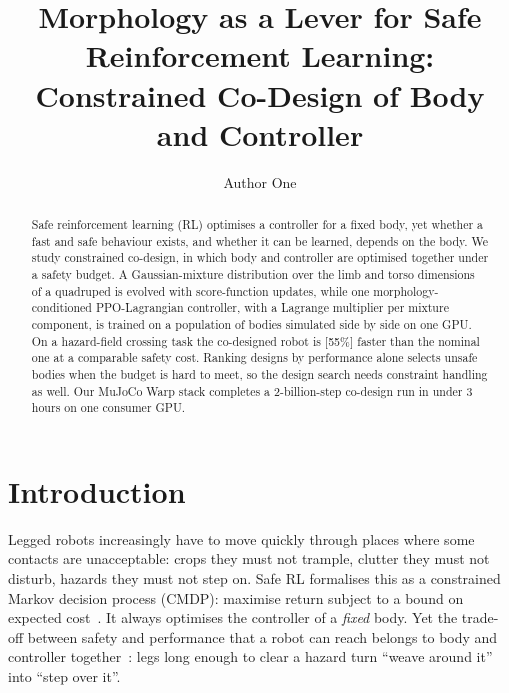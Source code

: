\documentclass[sigconf,review]{acmart}
\newcommand{\TODO}[1]{\textcolor{red!70!black}{[#1]}}
\begin{document}
\title[Morphology as a Lever for Safe RL]{Morphology as a Lever for Safe Reinforcement Learning: Constrained Co-Design of Body and Controller}

\author{Author One}

\renewcommand{\shortauthors}{Anonymous et al.}

\begin{abstract}
Safe reinforcement learning (RL) optimises a controller for a fixed body, yet whether a fast and safe behaviour exists, and whether it can be learned, depends on the body. We study constrained co-design, in which body and controller are optimised together under a safety budget. A Gaussian-mixture distribution over the limb and torso dimensions of a quadruped is evolved with score-function updates, while one morphology-conditioned PPO-Lagrangian controller, with a Lagrange multiplier per mixture component, is trained on a population of bodies simulated side by side on one GPU. On a hazard-field crossing task the co-designed robot is \TODO{55\%} faster than the nominal one at a comparable safety cost. Ranking designs by performance alone selects unsafe bodies when the budget is hard to meet, so the design search needs constraint handling as well. Our MuJoCo Warp stack completes a 2-billion-step co-design run in under 3 hours on one consumer GPU.
\end{abstract}



\maketitle

\section{Introduction}
\label{sec:intro}

Legged robots increasingly have to move quickly through places where some contacts are unacceptable: crops they must not trample, clutter they must not disturb, hazards they must not step on. Safe RL formalises this as a constrained Markov decision process (CMDP): maximise return subject to a bound on expected cost~\cite{altman1999constrained,achiam2017cpo,ray2019benchmarking}. It always optimises the controller of a \emph{fixed} body. Yet the trade-off between safety and performance that a robot can reach belongs to body and controller together~\cite{pfeifer2006body}: legs long enough to clear a hazard turn ``weave around it'' into ``step over it''.
\end{document}
